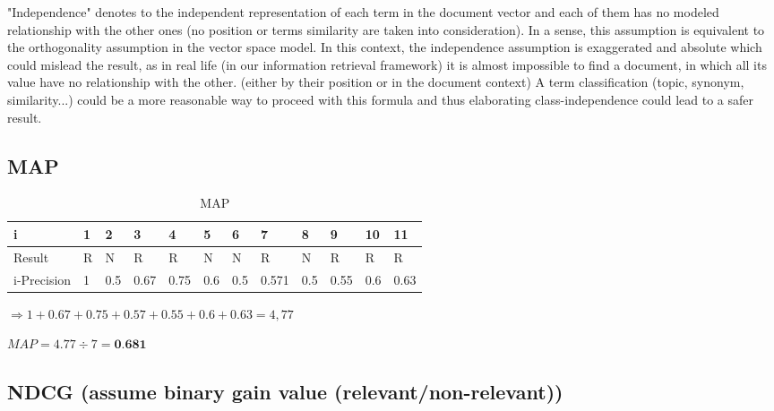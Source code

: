 \documentclass{scrartcl}
\begin{document}
"Independence" denotes to the independent representation of each term in the document vector and each of them has no modeled relationship with the other ones (no position or terms similarity are taken into consideration). In a sense, this assumption is equivalent to the orthogonality assumption in the vector space model. In this context, the independence assumption is exaggerated and absolute which could mislead the result, as in real life (in our information retrieval framework) it is almost impossible to find a document, in which all its value have no relationship with the other. (either by their position or in the document context) A term classification (topic, synonym, similarity...) could be a more reasonable way to proceed with this formula and thus elaborating class-independence could lead to a safer result.


\subsection{MAP}

\begin{table}[h]
\centering
\caption{MAP}
\begin{tabular}{|l|l|l|l|l|l|l|l|l|l|l|l|}
\hline
i           & 1 & 2   & 3    & 4    & 5   & 6   & 7     & 8   & 9    & 10  & 11   \\ \hline
Result      & R & N   & R    & R    & N   & N   & R     & N   & R    & R   & R    \\ \hline
i-Precision & 1 & 0.5 & 0.67 & 0.75 & 0.6 & 0.5 & 0.571 & 0.5 & 0.55 & 0.6 & 0.63 \\ \hline
\end{tabular}
\end{table}

$\Rightarrow 1 + 0.67 + 0.75 + 0.57 + 0.55 + 0.6 + 0.63 = 4,77 $

$ MAP = 4.77 \div 7 = \textbf{0.681} $

\subsection{NDCG (assume binary gain value (relevant/non-relevant)) }
\end{document}
